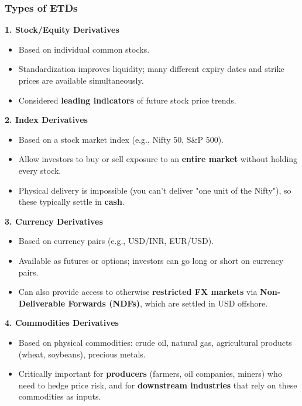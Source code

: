 \documentclass[12pt,openany]{book}
\begin{document}
\subsubsection{Types of ETDs}

\textbf{1. Stock/Equity Derivatives}
\begin{itemize}[leftmargin=*]
    \item Based on individual common stocks.
    \item Standardization improves liquidity; many different expiry dates and strike prices are available simultaneously.
    \item Considered \textbf{leading indicators} of future stock price trends.
\end{itemize}

\textbf{2. Index Derivatives}
\begin{itemize}[leftmargin=*]
    \item Based on a stock market index (e.g., Nifty 50, S\&P 500).
    \item Allow investors to buy or sell exposure to an \textbf{entire market} without holding every stock.
    \item Physical delivery is impossible (you can't deliver "one unit of the Nifty"), so these typically settle in \textbf{cash}.
\end{itemize}

\textbf{3. Currency Derivatives}
\begin{itemize}[leftmargin=*]
    \item Based on currency pairs (e.g., USD/INR, EUR/USD).
    \item Available as futures or options; investors can go long or short on currency pairs.
    \item Can also provide access to otherwise \textbf{restricted FX markets} via \textbf{Non-Deliverable Forwards (NDFs)}, which are settled in USD offshore.
\end{itemize}

\textbf{4. Commodities Derivatives}
\begin{itemize}[leftmargin=*]
    \item Based on physical commodities: crude oil, natural gas, agricultural products (wheat, soybeans), precious metals.
    \item Critically important for \textbf{producers} (farmers, oil companies, miners) who need to hedge price risk, and for \textbf{downstream industries} that rely on these commodities as inputs.
\end{itemize}
\end{document}
